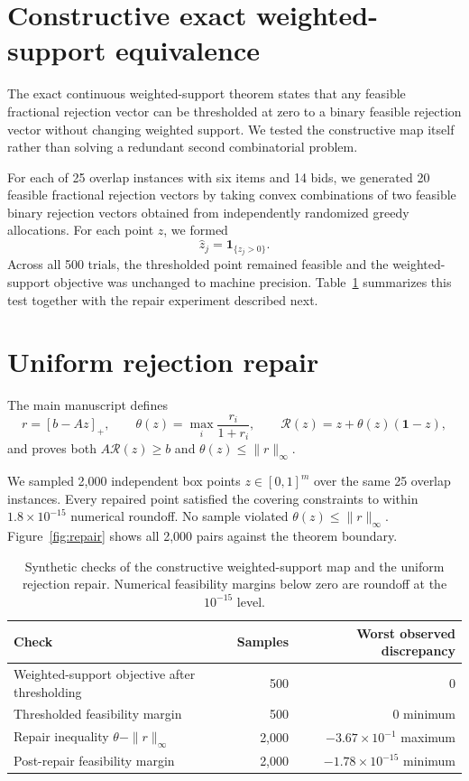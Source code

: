 \documentclass[preprint,12pt]{elsarticle}
\newcommand{\one}{\mathbf 1}
\newcommand{\pos}[1]{[#1]_+}
\begin{document}
\section{Constructive exact weighted-support equivalence}
The exact continuous weighted-support theorem states that any feasible fractional rejection vector can be thresholded at zero to a binary feasible rejection vector without changing weighted support. We tested the constructive map itself rather than solving a redundant second combinatorial problem.

For each of 25 overlap instances with six items and 14 bids, we generated 20 feasible fractional rejection vectors by taking convex combinations of two feasible binary rejection vectors obtained from independently randomized greedy allocations. For each point $z$, we formed
\[
 \widehat z_j=\mathbf 1_{\{z_j>0\}}.
\]
Across all 500 trials, the thresholded point remained feasible and the weighted-support objective was unchanged to machine precision. Table~\ref{tab:support-repair} summarizes this test together with the repair experiment described next.

\section{Uniform rejection repair}
The main manuscript defines
\[
 r=\pos{b-Az},\qquad
 \theta(z)=\max_i\frac{r_i}{1+r_i},\qquad
 \mathcal R(z)=z+\theta(z)(\one-z),
\]
and proves both $A\mathcal R(z)\ge b$ and $\theta(z)\le\|r\|_\infty$.

We sampled 2,000 independent box points $z\in[0,1]^m$ over the same 25 overlap instances. Every repaired point satisfied the covering constraints to within $1.8\times10^{-15}$ numerical roundoff. No sample violated $\theta(z)\le\|r\|_\infty$. Figure~\ref{fig:repair} shows all 2,000 pairs against the theorem boundary.

\begin{table}[t]
\centering
\caption{Synthetic checks of the constructive weighted-support map and the uniform rejection repair. Numerical feasibility margins below zero are roundoff at the $10^{-15}$ level.}
\label{tab:support-repair}
\small
\begin{tabularx}{\linewidth}{@{}Xrr@{}}
\toprule
Check & Samples & Worst observed discrepancy \\
\midrule
Weighted-support objective after thresholding & 500 & $0$ \\
Thresholded feasibility margin & 500 & $0$ minimum \\
Repair inequality $\theta-\|r\|_\infty$ & 2,000 & $-3.67\times10^{-1}$ maximum \\
Post-repair feasibility margin & 2,000 & $-1.78\times10^{-15}$ minimum \\
\bottomrule
\end{tabularx}
\end{table}
\end{document}
